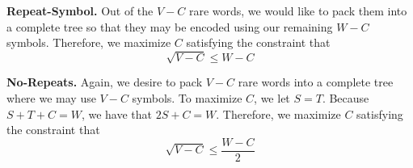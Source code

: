 \noindent\textbf{Repeat-Symbol.}
Out of the $V - C$ rare words, we would like to pack them into a complete tree
so that they may be encoded using our remaining $W - C$ symbols. Therefore, we
maximize $C$ satisfying the constraint that
$$\sqrt{V - C} \leq W - C$$

\noindent\textbf{No-Repeats.}
Again, we desire to pack $V - C$ rare words into a complete tree where we may
use $V - C$ symbols. To maximize $C$, we let $S = T$. Because $S + T + C = W$,
we have that $2S + C = W$. Therefore, we maximize $C$ satisfying the constraint
that
$$\sqrt{V - C} \leq \frac{W - C}{2}$$
